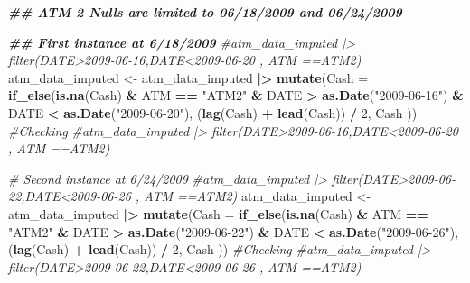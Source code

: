 \documentclass[
]{article}
\newenvironment{Shaded}{\begin{snugshade}}{\end{snugshade}}
\newcommand{\AttributeTok}[1]{\textcolor[rgb]{0.13,0.29,0.53}{#1}}
\newcommand{\CommentTok}[1]{\textcolor[rgb]{0.56,0.35,0.01}{\textit{#1}}}
\newcommand{\DecValTok}[1]{\textcolor[rgb]{0.00,0.00,0.81}{#1}}
\newcommand{\DocumentationTok}[1]{\textcolor[rgb]{0.56,0.35,0.01}{\textbf{\textit{#1}}}}
\newcommand{\FunctionTok}[1]{\textcolor[rgb]{0.13,0.29,0.53}{\textbf{#1}}}
\newcommand{\NormalTok}[1]{#1}
\newcommand{\OtherTok}[1]{\textcolor[rgb]{0.56,0.35,0.01}{#1}}
\newcommand{\SpecialCharTok}[1]{\textcolor[rgb]{0.81,0.36,0.00}{\textbf{#1}}}
\newcommand{\StringTok}[1]{\textcolor[rgb]{0.31,0.60,0.02}{#1}}
\begin{document}
\begin{Shaded}
\begin{Highlighting}[]
\DocumentationTok{\#\# ATM 2 Nulls are limited to 06/18/2009 and 06/24/2009}

\DocumentationTok{\#\# First instance at 6/18/2009}
\CommentTok{\#atm\_data\_imputed |\textgreater{} filter(DATE\textgreater{}\textquotesingle{}2009{-}06{-}16\textquotesingle{},DATE\textless{}\textquotesingle{}2009{-}06{-}20\textquotesingle{} , ATM ==\textquotesingle{}ATM2\textquotesingle{})}
\NormalTok{atm\_data\_imputed }\OtherTok{\textless{}{-}}\NormalTok{ atm\_data\_imputed }\SpecialCharTok{|\textgreater{}} \FunctionTok{mutate}\NormalTok{(}\AttributeTok{Cash =} \FunctionTok{if\_else}\NormalTok{(}\FunctionTok{is.na}\NormalTok{(Cash) }\SpecialCharTok{\&}\NormalTok{ ATM }\SpecialCharTok{==} \StringTok{"ATM2"} \SpecialCharTok{\&}\NormalTok{ DATE }\SpecialCharTok{\textgreater{}} \FunctionTok{as.Date}\NormalTok{(}\StringTok{"2009{-}06{-}16"}\NormalTok{) }\SpecialCharTok{\&}\NormalTok{ DATE }\SpecialCharTok{\textless{}} \FunctionTok{as.Date}\NormalTok{(}\StringTok{"2009{-}06{-}20"}\NormalTok{),}
\NormalTok{                                  (}\FunctionTok{lag}\NormalTok{(Cash) }\SpecialCharTok{+} \FunctionTok{lead}\NormalTok{(Cash)) }\SpecialCharTok{/} \DecValTok{2}\NormalTok{, Cash ))}
\CommentTok{\#Checking}
\CommentTok{\#atm\_data\_imputed |\textgreater{} filter(DATE\textgreater{}\textquotesingle{}2009{-}06{-}16\textquotesingle{},DATE\textless{}\textquotesingle{}2009{-}06{-}20\textquotesingle{} , ATM ==\textquotesingle{}ATM2\textquotesingle{})}

\CommentTok{\# Second instance at 6/24/2009}
\CommentTok{\#atm\_data\_imputed |\textgreater{} filter(DATE\textgreater{}\textquotesingle{}2009{-}06{-}22\textquotesingle{},DATE\textless{}\textquotesingle{}2009{-}06{-}26\textquotesingle{} , ATM ==\textquotesingle{}ATM2\textquotesingle{})}
\NormalTok{atm\_data\_imputed }\OtherTok{\textless{}{-}}\NormalTok{ atm\_data\_imputed }\SpecialCharTok{|\textgreater{}} \FunctionTok{mutate}\NormalTok{(}\AttributeTok{Cash =} \FunctionTok{if\_else}\NormalTok{(}\FunctionTok{is.na}\NormalTok{(Cash) }\SpecialCharTok{\&}\NormalTok{ ATM }\SpecialCharTok{==} \StringTok{"ATM2"} \SpecialCharTok{\&}\NormalTok{ DATE }\SpecialCharTok{\textgreater{}} \FunctionTok{as.Date}\NormalTok{(}\StringTok{"2009{-}06{-}22"}\NormalTok{) }\SpecialCharTok{\&}\NormalTok{ DATE }\SpecialCharTok{\textless{}} \FunctionTok{as.Date}\NormalTok{(}\StringTok{"2009{-}06{-}26"}\NormalTok{),}
\NormalTok{                                  (}\FunctionTok{lag}\NormalTok{(Cash) }\SpecialCharTok{+} \FunctionTok{lead}\NormalTok{(Cash)) }\SpecialCharTok{/} \DecValTok{2}\NormalTok{, Cash ))}
\CommentTok{\#Checking}
\CommentTok{\#atm\_data\_imputed |\textgreater{} filter(DATE\textgreater{}\textquotesingle{}2009{-}06{-}22\textquotesingle{},DATE\textless{}\textquotesingle{}2009{-}06{-}26\textquotesingle{} , ATM ==\textquotesingle{}ATM2\textquotesingle{})}


\end{Highlighting}
\end{Shaded}
\end{document}

